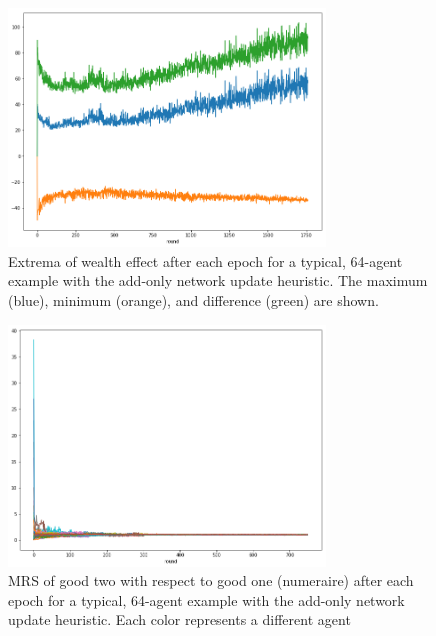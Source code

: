 \documentclass[smallextended]{svjour3}
\begin{document}
\begin{figure}
  \includegraphics[width=0.75\textwidth]{h1allgap.png}
  \caption{Extrema of wealth effect after each epoch for a typical, 64-agent
    example with the add-only network update heuristic. The maximum (blue),
    minimum (orange), and difference (green) are shown.}
  \label{h1allgap}
\end{figure}

\begin{figure}
  \includegraphics[width=0.75\textwidth]{h1prices.png}
  \caption{MRS of good two with respect to good one (numeraire) after each epoch
    for a typical, 64-agent example with the add-only network update heuristic.
    Each color represents a different agent}
  \label{h1prices}
\end{figure}
\end{document}
